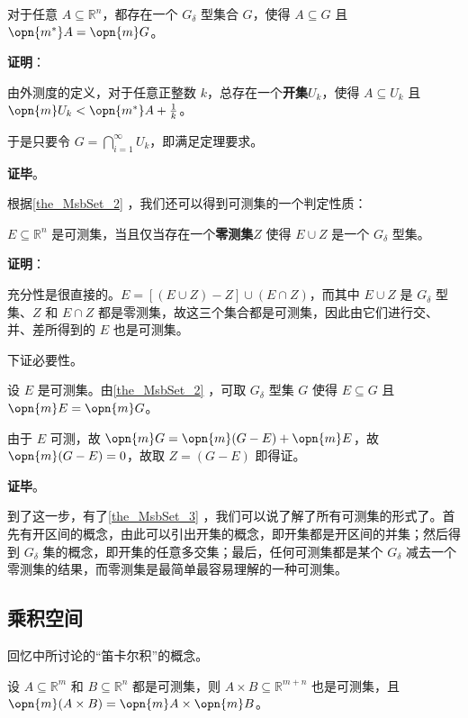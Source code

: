 \begin{theorem}{}\label{the_MsbSet_2}
对于任意 $A\subseteq \mathbb{R}^n$，都存在一个 $G_\delta$ 型集合 $G$，使得 $A\subseteq G$ 且 $\opn{m^*}A=\opn{m}G$。
\end{theorem}

\textbf{证明}：

由外测度的定义，对于任意正整数 $k$，总存在一个\textbf{开集}$U_k$，使得 $A\subseteq U_k$ 且 $\opn{m}U_k<\opn{m^*}A+\frac{1}{k}$。

于是只要令 $G=\bigcap_{i=1}^\infty U_k$，即满足定理要求。

\textbf{证毕}。








根据\autoref{the_MsbSet_2} ，我们还可以得到可测集的一个判定性质：

\begin{theorem}{}\label{the_MsbSet_3}
$E\subseteq \mathbb{R}^n$ 是可测集，当且仅当存在一个\textbf{零测集}$Z$ 使得 $E\cup Z$ 是一个 $G_\delta$ 型集。
\end{theorem}

\textbf{证明}：

充分性是很直接的。$E=[(E\cup Z)-Z]\cup(E\cap Z)$，而其中 $E\cup Z$ 是 $G_\delta$ 型集、$Z$ 和 $E\cap Z$ 都是零测集，故这三个集合都是可测集，因此由它们进行交、并、差所得到的 $E$ 也是可测集。

下证必要性。

设 $E$ 是可测集。由\autoref{the_MsbSet_2} ，可取 $G_\delta$ 型集 $G$ 使得 $E\subseteq G$ 且 $\opn{m}E=\opn{m}G$。

由于 $E$ 可测，故 $\opn{m}G=\opn{m}(G-E)+\opn{m}E$，故 $\opn{m}(G-E)=0$，故取 $Z=(G-E)$ 即得证。

\textbf{证毕}。

到了这一步，有了\autoref{the_MsbSet_3} ，我们可以说了解了所有可测集的形式了。首先有开区间的概念，由此可以引出开集的概念，即开集都是开区间的并集；然后得到 $G_\delta$ 集的概念，即开集的任意多交集；最后，任何可测集都是某个 $G_\delta$ 减去一个零测集的结果，而零测集是最简单最容易理解的一种可测集。


\subsection{乘积空间}

回忆中所讨论的“笛卡尔积”的概念。

\begin{theorem}{}
设 $A\subseteq\mathbb{R}^m$ 和 $B\subseteq\mathbb{R}^n$ 都是可测集，则 $A\times B \subseteq \mathbb{R}^{m+n}$ 也是可测集，且 $\opn{m}(A\times B)=\opn{m}A\times \opn{m}B$。
\end{theorem}


